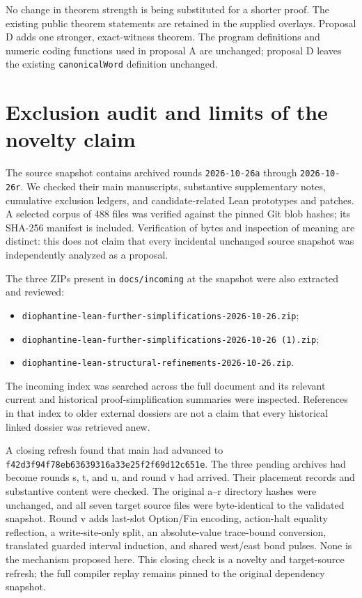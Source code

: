 \documentclass[11pt,letterpaper]{article}
\newcommand{\code}[1]{\nolinkurl{#1}}
\begin{document}
No change in theorem strength is being substituted for a shorter proof. The existing public theorem statements are retained in the supplied overlays. Proposal D adds one stronger, exact-witness theorem. The program definitions and numeric coding functions used in proposal A are unchanged; proposal D leaves the existing \code{canonicalWord} definition unchanged.



\section{Exclusion audit and limits of the novelty claim}
The source snapshot contains archived rounds \code{2026-10-26a} through \code{2026-10-26r}. We checked their main manuscripts, substantive supplementary notes, cumulative exclusion ledgers, and candidate-related Lean prototypes and patches. A selected corpus of 488 files was verified against the pinned Git blob hashes; its SHA-256 manifest is included. Verification of bytes and inspection of meaning are distinct: this does not claim that every incidental unchanged source snapshot was independently analyzed as a proposal.

The three ZIPs present in \code{docs/incoming} at the snapshot were also extracted and reviewed:
\begin{itemize}
\item \code{diophantine-lean-further-simplifications-2026-10-26.zip};
\item \code{diophantine-lean-further-simplifications-2026-10-26 (1).zip};
\item \code{diophantine-lean-structural-refinements-2026-10-26.zip}.
\end{itemize}
The incoming index was searched across the full document and its relevant current and historical proof-simplification summaries were inspected. References in that index to older external dossiers are not a claim that every historical linked dossier was retrieved anew.

A closing refresh found that main had advanced to \code{f42d3f94f78eb63639316a33e25f2f69d12c651e}. The three pending archives had become rounds s, t, and u, and round v had arrived. Their placement records and substantive content were checked. The original a--r directory hashes were unchanged, and all seven target source files were byte-identical to the validated snapshot. Round v adds last-slot Option/Fin encoding, action-halt equality reflection, a write-site-only split, an absolute-value trace-bound conversion, translated guarded interval induction, and shared west/east bond pulses. None is the mechanism proposed here. This closing check is a novelty and target-source refresh; the full compiler replay remains pinned to the original dependency snapshot.
\end{document}
